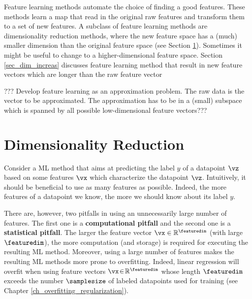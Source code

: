 \documentclass[12pt]{report}
\begin{document}
Feature learning methods automate the choice of finding a good features. These 
methods learn a map that read in the original raw features and transform them to 
a set of new features. A subclass of feature learning methods are dimensionality 
reduction methods, where the new feature space has a (much) smaller dimension 
than the original feature space (see Section \ref{sec_dim_red}). Sometimes 
it might be useful to change to a higher-dimensional feature space. Section \ref{sec_dim_increas} 
discusses feature learning method that result in new feature vectors which 
are longer than the raw feature vector 


??? Develop feature learning as an approximation problem. The raw data 
is the vector to be approximated. The approximation has to be in a (small) 
subspace which is spanned by all possible low-dimensional feature vectors???

\section{Dimensionality Reduction} 
\label{sec_dim_red}

Consider a ML method that aims at predicting the label $y$ of a datapoint $\vz$ 
based on some features $\vx$ which characterize the datapoint $\vz$. Intuitively, it 
should be beneficial to use as many features as possible. Indeed, the more features 
of a datapoint we know, the more we should know about its label $y$. 

There are, however, two pitfalls in using an unnecessarily large number of features. 
The first one is a {\bf computational pitfall} and the second one is a {\bf statistical pitfall}. 
The larger the feature vector $\vx \in \mathbb{R}^{\featuredim}$ (with large $\featuredim$), 
the more computation (and storage) is required for executing the resulting ML method. 
Moreover, using a large number of features makes the resulting ML methods more prone to 
overfitting. Indeed, linear regression will overfit when using feature vectors $\vx\!\in\!\mathbb{R}^{\featuredim}$ 
whose length $\featuredim$ exceeds the number $\samplesize$ of labeled datapoints used 
for training (see Chapter \ref{ch_overfitting_regularization}). 
\end{document}
